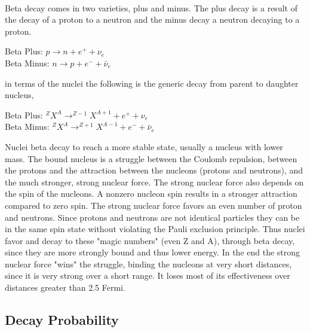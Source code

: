 \documentclass{report}
\begin{document}
\paragraph{}
Beta decay comes in two varieties, plus and minus. The plus decay is a result of the decay of 
a proton to a neutron and the minus decay a neutron decaying to a proton.
\begin{center}
Beta Plus:      $p \rightarrow n + e^+ + \nu_e$\\
Beta Minus: $n \rightarrow p + e^- + \bar\nu_e$
\end{center}
in terms of the nuclei the following is the generic decay from parent to daughter nucleus,
\begin{center}
Beta Plus: $ ^{Z} X^A \rightarrow ^{Z-1}X^{A+1} + e^+ + \nu_e$ \\
Beta Minus: $ ^{Z} X^A \rightarrow ^{Z+1}X^{A-1} + e^- + \bar\nu_e$
\end{center}
Nuclei beta decay to reach a more stable state, usually a nucleus with lower mass. 
The bound nucleus is a struggle between the Coulomb repulsion, between the protons and the attraction
between the nucleons (protons and neutrons), and the much stronger, strong nuclear force. The strong
 nuclear force also depends on the spin of the nucleons. A nonzero nucleon spin results in a stronger 
 attraction compared to zero spin. 
The strong nuclear force favors an even number of proton and neutrons. Since protons and 
neutrons are not identical particles they can be in the same spin state without violating the Pauli
exclusion principle. Thus nuclei favor and decay to these "magic numbers" (even Z and A), through beta decay, 
since they are more strongly bound and thus lower energy. In the end the strong nuclear force "wins" the struggle,
 binding the nucleons at very short distances, 
since it is very strong over a short range. It loses most of its effectiveness over distances greater than 2.5 Fermi. 

\subsection{Decay Probability}
\end{document}
